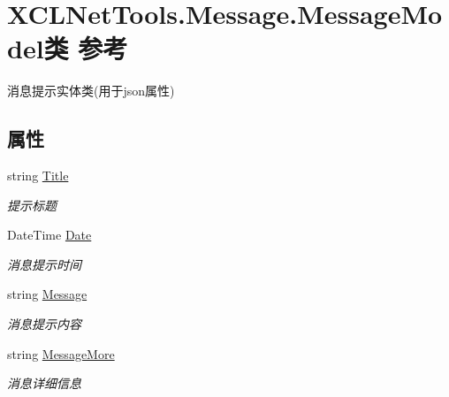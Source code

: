 \hypertarget{class_x_c_l_net_tools_1_1_message_1_1_message_model}{\section{X\-C\-L\-Net\-Tools.\-Message.\-Message\-Model类 参考}
\label{class_x_c_l_net_tools_1_1_message_1_1_message_model}
}


消息提示实体类(用于json属性)  


\subsection*{属性}
\begin{DoxyCompactItemize}
\item 
string \hyperlink{class_x_c_l_net_tools_1_1_message_1_1_message_model_a580b7fe7f6918b6803a7e7b8e656905b}{Title}
\begin{DoxyCompactList}\small\item\em 提示标题 \end{DoxyCompactList}\item 
Date\-Time \hyperlink{class_x_c_l_net_tools_1_1_message_1_1_message_model_a29a69610fff39e33d85105a5ca50dd20}{Date}
\begin{DoxyCompactList}\small\item\em 消息提示时间 \end{DoxyCompactList}\item 
string \hyperlink{class_x_c_l_net_tools_1_1_message_1_1_message_model_a2c6df6335e3adab4b188833ce8fec192}{Message}
\begin{DoxyCompactList}\small\item\em 消息提示内容 \end{DoxyCompactList}\item 
string \hyperlink{class_x_c_l_net_tools_1_1_message_1_1_message_model_a75446ff337c7baa946a5367d085f8279}{Message\-More}
\begin{DoxyCompactList}\small\item\em 消息详细信息 \end{DoxyCompactList}\item 

\end{DoxyCompactItemize}
